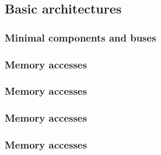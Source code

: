%
%

\subsection{Basic architectures}


\begin{frame}
  \frametitle{Minimal components and buses}

  \begin{center}
  \end{center}

\end{frame}


\begin{frame}
  \frametitle{Memory accesses}

  \begin{center}
  \end{center}

\end{frame}


\begin{frame}
  \frametitle{Memory accesses}

  \begin{center}
  \end{center}

\end{frame}


\begin{frame}
  \frametitle{Memory accesses}

  \begin{center}
  \end{center}

\end{frame}


\begin{frame}
  \frametitle{Memory accesses}

  \begin{center}
  \end{center}

\end{frame}


